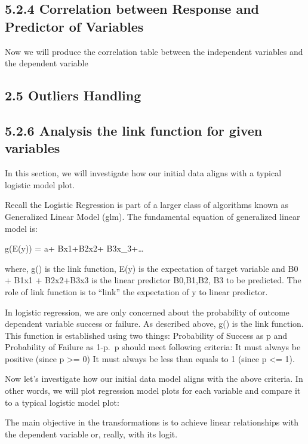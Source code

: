 \documentclass[english,floatsintext,man]{apa6}
\begin{document}
\subsection{5.2.4 Correlation between Response and Predictor of
Variables}\label{correlation-between-response-and-predictor-of-variables}

Now we will produce the correlation table between the independent
variables and the dependent variable

\subsection{2.5 Outliers Handling}\label{outliers-handling}

\subsection{5.2.6 Analysis the link function for given
variables}\label{analysis-the-link-function-for-given-variables}

In this section, we will investigate how our initial data aligns with a
typical logistic model plot.

Recall the Logistic Regression is part of a larger class of algorithms
known as Generalized Linear Model (glm). The fundamental equation of
generalized linear model is:

g(E(y)) = a+ Bx1+B2x2+ B3x\_3+\ldots{}

where, g() is the link function, E(y) is the expectation of target
variable and B0 + B1x1 + B2x2+B3x3 is the linear predictor B0,B1,B2, B3
to be predicted. The role of link function is to \enquote{link} the
expectation of y to linear predictor.

In logistic regression, we are only concerned about the probability of
outcome dependent variable success or failure. As described above, g()
is the link function. This function is established using two things:
Probability of Success as p and Probability of Failure as 1-p.~p should
meet following criteria: It must always be positive (since p
\textgreater{}= 0) It must always be less than equals to 1 (since p
\textless{}= 1).

Now let's investigate how our initial data model aligns with the above
criteria. In other words, we will plot regression model plots for each
variable and compare it to a typical logistic model plot:

The main objective in the transformations is to achieve linear
relationships with the dependent variable or, really, with its logit.
\end{document}
